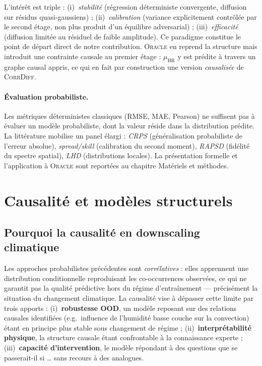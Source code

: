 \documentclass[14pt,a4paper,openany]{extreport}
\theoremstyle{definition}
\newcommand{\Oracle}{\textsc{Oracle}}
\newcommand{\CorrDiff}{\textsc{CorrDiff}}
\newcommand{\HR}{\ensuremath{\text{HR}}}
\newcommand{\muHR}{\ensuremath{\mu_{\HR}}}
\begin{document}
L'intérêt est triple : (i)~\emph{stabilité} (régression déterministe convergente, diffusion sur résidus quasi-gaussiens) ; (ii)~\emph{calibration} (variance explicitement contrôlée par le second étage, non plus produit d'un équilibre adversarial) ; (iii)~\emph{efficacité} (diffusion limitée au résiduel de faible amplitude). Ce paradigme constitue le point de départ direct de notre contribution. \Oracle{} en reprend la structure mais introduit une contrainte causale au premier étage : $\muHR$ y est prédite à travers un graphe causal appris, ce qui en fait par construction une version \emph{causalisée} de \CorrDiff{}.

\paragraph{Évaluation probabiliste.}
\label{ssec:eval-encart}
Les métriques déterministes classiques (RMSE, MAE, Pearson) ne suffisent pas à évaluer un modèle probabiliste, dont la valeur réside dans la distribution prédite. La littérature mobilise un panel élargi : \emph{CRPS} (généralisation probabiliste de l'erreur absolue), \emph{spread/skill} (calibration du second moment), \emph{RAPSD} (fidélité du spectre spatial), \emph{LHD} (distributions locales). La présentation formelle et l'application à \Oracle{} sont reportées au chapitre Matériels et méthodes.

\section{Causalité et modèles structurels}
\label{sec:causalite}

\subsection{Pourquoi la causalité en downscaling climatique}
\label{ssec:why-causal}

Les approches probabilistes précédentes sont \emph{corrélatives} : elles apprennent une distribution conditionnelle reproduisant les co-occurrences observées, ce qui ne garantit pas la qualité prédictive hors du régime d'entraînement --- précisément la situation du changement climatique. La causalité vise à dépasser cette limite par trois apports : (i)~\textbf{robustesse OOD}, un modèle reposant sur des relations causales identifiées (e.g.~influence de l'humidité basse couche sur la convection) étant en principe plus stable sous changement de régime ; (ii)~\textbf{interprétabilité physique}, la structure causale étant confrontable à la connaissance experte ; (iii)~\textbf{capacité d'intervention}, le modèle répondant à des questions \og que se passerait-il si \dots \fg{} sans recours à des analogues.
\end{document}
